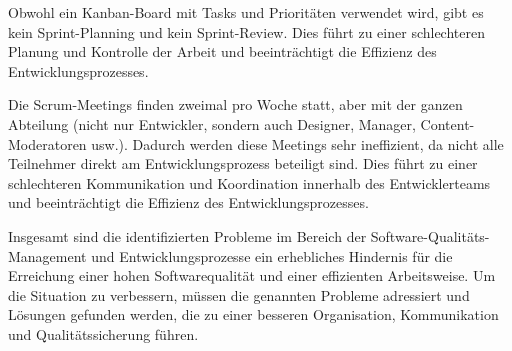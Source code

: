 Obwohl ein Kanban-Board mit Tasks und Prioritäten verwendet wird, 
gibt es kein Sprint-Planning und kein Sprint-Review. 
Dies führt zu einer schlechteren Planung und Kontrolle der Arbeit 
und beeinträchtigt die Effizienz des Entwicklungsprozesses.

Die Scrum-Meetings finden zweimal pro Woche statt, 
aber mit der ganzen Abteilung (nicht nur Entwickler, sondern auch Designer, Manager, Content-Moderatoren usw.). 
Dadurch werden diese Meetings sehr ineffizient, 
da nicht alle Teilnehmer direkt am Entwicklungsprozess beteiligt sind. 
Dies führt zu einer schlechteren Kommunikation und Koordination innerhalb des Entwicklerteams 
und beeinträchtigt die Effizienz des Entwicklungsprozesses.

Insgesamt sind die identifizierten Probleme im Bereich der Software-Qualitäts-Management 
und Entwicklungsprozesse ein erhebliches Hindernis für die Erreichung einer 
hohen Softwarequalität und einer effizienten Arbeitsweise. Um die Situation zu verbessern, 
müssen die genannten Probleme adressiert und Lösungen gefunden werden, 
die zu einer besseren Organisation, Kommunikation und Qualitätssicherung führen.